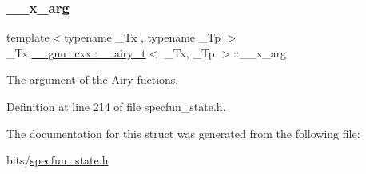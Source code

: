 \subsubsection{\texorpdfstring{\+\_\+\+\_\+x\+\_\+arg}{\_\_x\_arg}}
{\footnotesize\ttfamily template$<$typename \+\_\+\+Tx , typename \+\_\+\+Tp $>$ \\
\+\_\+\+Tx \hyperlink{struct____gnu__cxx_1_1____airy__t}{\+\_\+\+\_\+gnu\+\_\+cxx\+::\+\_\+\+\_\+airy\+\_\+t}$<$ \+\_\+\+Tx, \+\_\+\+Tp $>$\+::\+\_\+\+\_\+x\+\_\+arg}



The argument of the Airy fuctions. 



Definition at line 214 of file specfun\+\_\+state.\+h.



The documentation for this struct was generated from the following file\+:\begin{DoxyCompactItemize}
\item 
bits/\hyperlink{specfun__state_8h}{specfun\+\_\+state.\+h}\end{DoxyCompactItemize}
